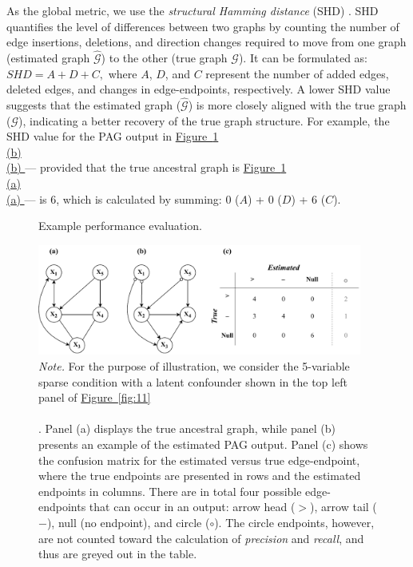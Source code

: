 \documentclass[twoside, 11pt]{article}
\newcommand*{\figref}[2][]{%
  \hyperref[{fig:#2}]{%
    Figure~\ref*{fig:#2}%
    \ifx\\#1\\%
    \else
      #1%
    \fi
  }%
}
\begin{document}
As the global metric, we use the \textit{structural Hamming distance} (SHD) \citep{de2009comparison}. SHD quantifies the level of differences between two graphs by counting the number of edge insertions, deletions, and direction changes required to move from one graph (estimated graph $\hat{\mathcal{G}}$) to the other (true graph $\mathcal{G}$). It can be formulated as:
$\textit{SHD} = A + D + C,$
where $A$, $D$, and $C$ represent the number of added edges, deleted edges, and changes in edge-endpoints, respectively. A lower SHD value suggests that the estimated graph ($\hat{\mathcal{G}}$) is more closely aligned with the true graph ($\mathcal{G}$), indicating a better recovery of the true graph structure. For example, the SHD value for the PAG output in \figref[(b)]{12} --- provided that the true ancestral graph is \figref[(a)]{12} --- is 6, which is calculated by summing: 0 ($A$) + 0 ($D$) + 6 ($C$).

\vspace{6mm}

\begin{figure}[!hb]
    \centering
        \caption{Example performance evaluation.}
        \vspace{1mm}
        \includegraphics[width=0.95\textwidth]{figures/Fig13.pdf}
        \vspace*{2mm}
        \caption*{\small{\textit{Note.} 
        For the purpose of illustration, we consider the 5-variable sparse condition with a latent confounder shown in the top left panel of \figref[]{11}. Panel (a) displays the true ancestral graph, while panel (b) presents an example of the estimated PAG output. Panel (c) shows the confusion matrix for the estimated versus true edge-endpoint, where the true endpoints are presented in rows and the estimated endpoints in columns. There are in total four possible edge-endpoints that can occur in an output: arrow head ($>$), arrow tail ($-$), null (no endpoint), and circle ($\circ$). The circle endpoints, however, are not counted toward the calculation of \textit{precision} and \textit{recall}, and thus are greyed out in the table.}}
    \label{fig:12}
\end{figure}
\end{document}
